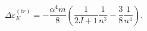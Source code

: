 \begin{equation}
\Delta \varepsilon _{K}^{(tr)}=-\frac{\alpha ^{4}m}{8}\left( \frac{1}{2J+1}%
\frac{1}{n^{3}}-\frac{3}{8}\frac{1}{n^{4}}\right) .
\end{equation}


